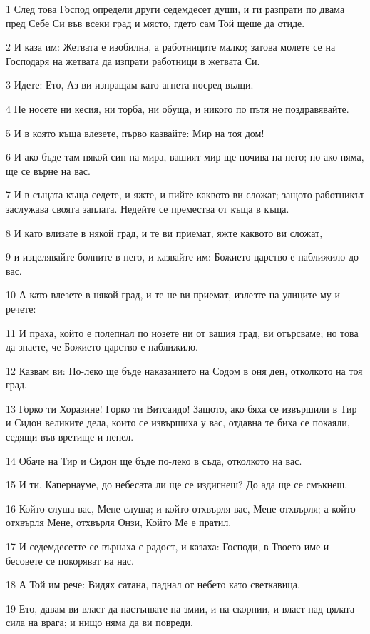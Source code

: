 \par 1 След това Господ определи други седемдесет души, и ги разпрати по двама пред Себе Си във всеки град и място, гдето сам Той щеше да отиде.
\par 2 И каза им: Жетвата е изобилна, а работниците малко; затова молете се на Господаря на жетвата да изпрати работници в жетвата Си.
\par 3 Идете: Ето, Аз ви изпращам като агнета посред вълци.
\par 4 Не носете ни кесия, ни торба, ни обуща, и никого по пътя не поздравявайте.
\par 5 И в която къща влезете, първо казвайте: Мир на тоя дом!
\par 6 И ако бъде там някой син на мира, вашият мир ще почива на него; но ако няма, ще се върне на вас.
\par 7 И в същата къща седете, и яжте, и пийте каквото ви сложат; защото работникът заслужава своята заплата. Недейте се премества от къща в къща.
\par 8 И като влизате в някой град, и те ви приемат, яжте каквото ви сложат,
\par 9 и изцелявайте болните в него, и казвайте им: Божието царство е наближило до вас.
\par 10 А като влезете в някой град, и те не ви приемат, излезте на улиците му и речете:
\par 11 И праха, който е полепнал по нозете ни от вашия град, ви отърсваме; но това да знаете, че Божието царство е наближило.
\par 12 Казвам ви: По-леко ще бъде наказанието на Содом в оня ден, отколкото на тоя град.
\par 13 Горко ти Хоразине! Горко ти Витсаидо! Защото, ако бяха се извършили в Тир и Сидон великите дела, които се извършиха у вас, отдавна те биха се покаяли, седящи във вретище и пепел.
\par 14 Обаче на Тир и Сидон ще бъде по-леко в съда, отколкото на вас.
\par 15 И ти, Капернауме, до небесата ли ще се издигнеш? До ада ще се смъкнеш.
\par 16 Който слуша вас, Мене слуша; и който отхвърля вас, Мене отхвърля; а който отхвърля Мене, отхвърля Онзи, Който Ме е пратил.
\par 17 И седемдесетте се върнаха с радост, и казаха: Господи, в Твоето име и бесовете се покоряват на нас.
\par 18 А Той им рече: Видях сатана, паднал от небето като светкавица.
\par 19 Ето, давам ви власт да настъпвате на змии, и на скорпии, и власт над цялата сила на врага; и нищо няма да ви повреди.
